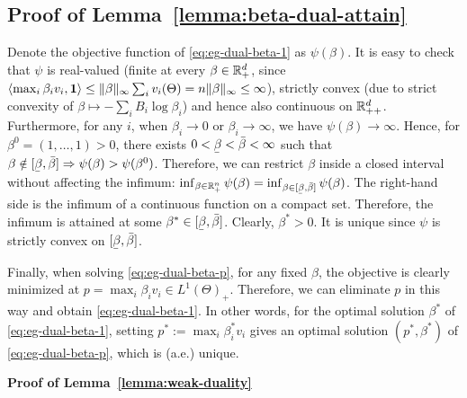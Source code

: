 	\subsection*{Proof of Lemma~\ref{lemma:beta-dual-attain}}
	Denote the objective function of \eqref{eq:eg-dual-beta-1} as $\psi(\beta)$. It is easy to check that $\psi$ is real-valued (finite at every $\beta\in \mathbb{R}^d_+$, since $\langle \max_i \beta_i v_i, \mathbf{1} \rangle \leq \|\beta\|_\infty \sum_i v_i(\Theta) = n \|\beta\|_\infty \leq \infty $), strictly convex (due to strict convexity of $\beta\mapsto -\sum_i B_i \log \beta_i$) and hence also continuous on $\mathbb{R}^d_{++}$.
	Furthermore, for any $i$, when $\beta_i\rightarrow 0$ or $\beta_i \rightarrow \infty$, we have $\psi(\beta) \rightarrow \infty$.
	Hence, for $\beta^0 = (1, \dots, 1)>0$, there exists $0 < \ubar{\beta} < \bar{\beta} < \infty$ such that 
	$\beta\notin [\ubar{\beta}, \bar{\beta}] \Rightarrow \psi(\beta) > \psi(\beta^0)$.
	Therefore, we can restrict $\beta$ inside a closed interval without affecting the infimum:
	$ \inf_{\beta\in \RR_+^n } \psi(\beta) = \inf_{\beta\in [\ubar{\beta}, \bar{\beta}] }\psi(\beta)$. 
	The right-hand side is the infimum of a continuous function on a compact set. Therefore, the infimum is attained at some $\beta^* \in [\ubar{\beta}, \bar{\beta}]$. Clearly, $\beta^* > 0$. It is unique since $\psi$ is strictly convex on $[\ubar{\beta}, \bar{\beta}]$.
	
	Finally, when solving \eqref{eq:eg-dual-beta-p}, for any fixed $\beta$, the objective is clearly minimized at $p = \max_i \beta_i v_i \in L^1(\Theta)_+$. Therefore, we can eliminate $p$ in this way and obtain \eqref{eq:eg-dual-beta-1}. In other words, for the optimal solution $\beta^*$ of \eqref{eq:eg-dual-beta-1}, setting $p^* := \max_i \beta^*_i v_i$ gives an optimal solution $(p^*, \beta^*)$ of \eqref{eq:eg-dual-beta-p}, which is (a.e.) unique. 

	\smallskip\noindent\textbf{Proof of Lemma~\ref{lemma:weak-duality}}
